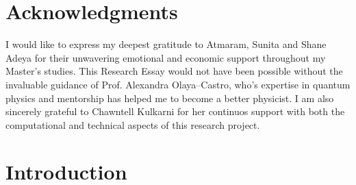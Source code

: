 \documentclass[11pt]{article}
\begin{document}
\newpage
\section*{Acknowledgments}
I would like to express my deepest gratitude to Atmaram, Sunita and Shane Adeya for their unwavering emotional and economic support throughout my Master's studies. This Research Essay would not have been possible without the invaluable guidance of Prof. Alexandra Olaya--Castro, who's expertise in quantum physics and mentorship has helped me to become a better physicist. I am also sincerely grateful to Chawntell Kulkarni for her continuos support with both the computational and technical aspects of this research project.  
\newpage
{}
\tableofcontents

\newpage
\section{Introduction}
\end{document}
